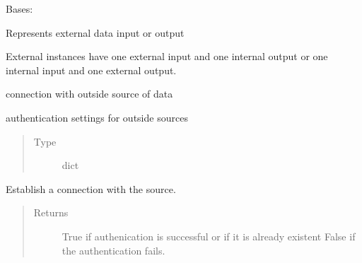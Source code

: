 \documentclass[letterpaper,10pt,english]{sphinxmanual}
\begin{document}
\begin{fulllineitems}
\label{\detokenize{dalio.external:dalio.external.external.External}}
Bases: 

Represents external data input or output

External instances have one external input and one internal output or one
internal input and one external output.

\begin{fulllineitems}
\label{\detokenize{dalio.external:dalio.external.external.External._connection}}
connection with outside source of data

\end{fulllineitems}


\begin{fulllineitems}
\label{\detokenize{dalio.external:dalio.external.external.External._config}}
authentication settings for outside sources
\begin{quote}\begin{description}
\item[{Type}] \leavevmode
dict

\end{description}\end{quote}

\end{fulllineitems}


\begin{fulllineitems}
\label{\detokenize{dalio.external:dalio.external.external.External.authenticate}}
Establish a connection with the source.
\begin{quote}\begin{description}
\item[{Returns}] \leavevmode
True if authenication is successful or if it is already existent
False if the authentication fails.


\end{description}
\end{quote}
\end{fulllineitems}
\end{fulllineitems}
\end{document}
